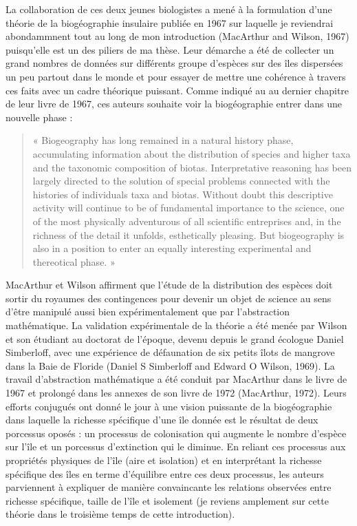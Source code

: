 La collaboration de ces deux jeunes biologistes a mené à la formulation
d'une théorie de la biogéographie insulaire publiée en 1967 sur laquelle
je reviendrai abondammnent tout au long de mon introduction (MacArthur
and Wilson, 1967) puisqu'elle est un des piliers de ma thèse. Leur
démarche a été de collecter un grand nombres de données sur différents
groupe d'espèces sur des îles dispersées un peu partout dans le monde et
pour essayer de mettre une cohérence à travers ces faits avec un cadre
théorique puissant. Comme indiqué au au dernier chapitre de leur livre
de 1967, ces auteurs souhaite voir la biogéographie entrer dans une
nouvelle phase :

\begin{quote}
« Biogeography has long remained in a natural history phase,
accumulating information about the distribution of species and higher
taxa and the taxonomic composition of biotas. Interpretative reasoning
has been largely directed to the solution of special problems connected
with the histories of individuals taxa and biotas. Without doubt this
descriptive activity will continue to be of fundamental importance to
the science, one of the most physically adventurous of all scientific
entreprises and, in the richness of the detail it unfolds, esthetically
pleasing. But biogeography is also in a position to enter an equally
interesting experimental and thereotical phase. »
\end{quote}

MacArthur et Wilson affirment que l'étude de la distribution des espèces
doit sortir du royaumes des contingences pour devenir un objet de
science au sens d'être manipulé aussi bien expérimentalement que par
l'abstraction mathématique. La validation expérimentale de la théorie a
été menée par Wilson et son étudiant au doctorat de l'époque, devenu
depuis le grand écologue Daniel Simberloff, avec une expérience de
défaunation de six petits îlots de mangrove dans la Baie de Floride
(Daniel S Simberloff and Edward O Wilson, 1969). La travail
d'abstraction mathématique a été conduit par MacArthur dans le livre de
1967 et prolongé dans les annexes de son livre de 1972 (MacArthur,
1972). Leurs efforts conjugués ont donné le jour à une vision puissante
de la biogéographie dans laquelle la richesse spécifique d'une île
donnée est le résultat de deux porcessus oposés : un processus de
colonisation qui augmente le nombre d'espèce sur l'île et un porcessus
d'extinction qui le diminue. En reliant ces processus aux propriétés
physiques de l'île (aire et isolation) et en interprétant la richesse
spécifique des îles en terme d'équilibre entre ces deux processus, les
auteurs parviennent à expliquer de manière convaincante les relations
observées entre richesse spécifique, taille de l'île et isolement (je
reviens amplement sur cette théorie dans le troisième temps de cette
introduction).

